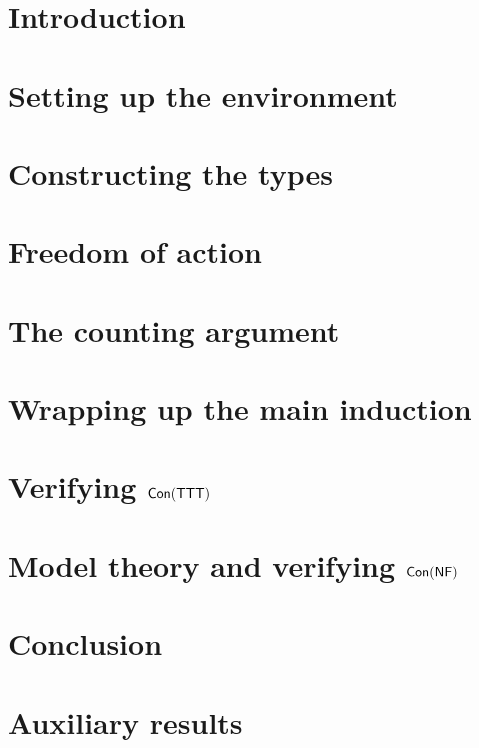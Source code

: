 \chapter{Introduction}


\chapter{Setting up the environment}


\chapter{Constructing the types}


\chapter{Freedom of action}


\chapter{The counting argument}


\chapter{Wrapping up the main induction}


\chapter{Verifying \texorpdfstring{\( \operatorname{\mathsf{Con}}(\mathsf{TTT}) \)}{Con(TTT)}}


\chapter{Model theory and verifying \texorpdfstring{\( \operatorname{\mathsf{Con}}(\mathsf{NF}) \)}{Con(NF)}}


\chapter{Conclusion}


\appendix
\chapter{Auxiliary results}




